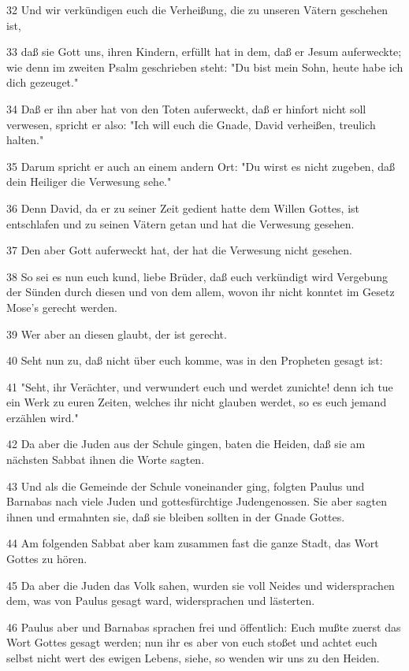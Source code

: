 \par 32 Und wir verkündigen euch die Verheißung, die zu unseren Vätern geschehen ist,
\par 33 daß sie Gott uns, ihren Kindern, erfüllt hat in dem, daß er Jesum auferweckte; wie denn im zweiten Psalm geschrieben steht: "Du bist mein Sohn, heute habe ich dich gezeuget."
\par 34 Daß er ihn aber hat von den Toten auferweckt, daß er hinfort nicht soll verwesen, spricht er also: "Ich will euch die Gnade, David verheißen, treulich halten."
\par 35 Darum spricht er auch an einem andern Ort: "Du wirst es nicht zugeben, daß dein Heiliger die Verwesung sehe."
\par 36 Denn David, da er zu seiner Zeit gedient hatte dem Willen Gottes, ist entschlafen und zu seinen Vätern getan und hat die Verwesung gesehen.
\par 37 Den aber Gott auferweckt hat, der hat die Verwesung nicht gesehen.
\par 38 So sei es nun euch kund, liebe Brüder, daß euch verkündigt wird Vergebung der Sünden durch diesen und von dem allem, wovon ihr nicht konntet im Gesetz Mose's gerecht werden.
\par 39 Wer aber an diesen glaubt, der ist gerecht.
\par 40 Seht nun zu, daß nicht über euch komme, was in den Propheten gesagt ist:
\par 41 "Seht, ihr Verächter, und verwundert euch und werdet zunichte! denn ich tue ein Werk zu euren Zeiten, welches ihr nicht glauben werdet, so es euch jemand erzählen wird."
\par 42 Da aber die Juden aus der Schule gingen, baten die Heiden, daß sie am nächsten Sabbat ihnen die Worte sagten.
\par 43 Und als die Gemeinde der Schule voneinander ging, folgten Paulus und Barnabas nach viele Juden und gottesfürchtige Judengenossen. Sie aber sagten ihnen und ermahnten sie, daß sie bleiben sollten in der Gnade Gottes.
\par 44 Am folgenden Sabbat aber kam zusammen fast die ganze Stadt, das Wort Gottes zu hören.
\par 45 Da aber die Juden das Volk sahen, wurden sie voll Neides und widersprachen dem, was von Paulus gesagt ward, widersprachen und lästerten.
\par 46 Paulus aber und Barnabas sprachen frei und öffentlich: Euch mußte zuerst das Wort Gottes gesagt werden; nun ihr es aber von euch stoßet und achtet euch selbst nicht wert des ewigen Lebens, siehe, so wenden wir uns zu den Heiden.
